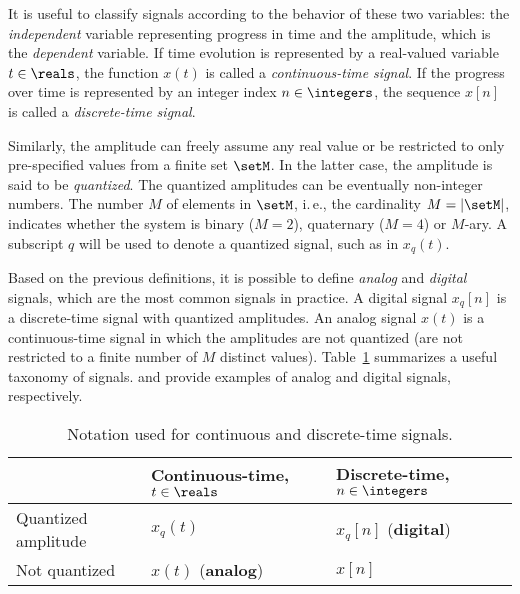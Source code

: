 It is useful to classify signals according to the behavior of these two variables: the \emph{independent} variable representing progress in time and the amplitude, which is the \emph{dependent} variable. If time evolution is represented by a real-valued variable $t \in \reals$, the function $x(t)$ is called a \emph{continuous-time signal}. If the progress over time is represented by an integer index $n \in \integers$, the sequence $x[n]$ is called a \emph{discrete-time signal}.

Similarly, the amplitude can freely assume any real value or be restricted to only pre-specified values from a finite set $\setM$. In the latter case, the amplitude is said to be \emph{quantized}. The quantized amplitudes can be eventually non-integer numbers. The number $M$ of elements in $\setM$, i.\,e., the cardinality $M=|\setM|$, indicates whether the system is binary ($M=2$), quaternary ($M=4$) or $M$-ary. A subscript $q$ will be used to denote a quantized signal, such as in $x_q(t)$.

Based on the previous definitions, it is possible to define \emph{analog} and \emph{digital} signals, which are the most common signals in practice.
A digital signal  $x_q[n]$ is a discrete-time signal with quantized amplitudes. An analog signal  $x(t)$ is a continuous-time signal in which the amplitudes are not quantized (are not restricted to a finite number of $M$ distinct values). Table~\ref{tab:signals_classification} summarizes a useful taxonomy of signals.
 and  provide examples of analog and digital signals, respectively. 

\begin{table}
 \centering
 \caption{Notation used for continuous and discrete-time signals. \label{tab:signals_classification}}
 \begin{tabularx}{\textwidth}{lXX}
 \toprule
 							& Continuous-time, $t \in \reals$ & Discrete-time, $n \in \integers$ \\\midrule
Quantized amplitude		& $x_q(t)$ & $x_q[n]$ (\textbf{digital}) \\ 
Not quantized & $x(t)$ (\textbf{analog}) & $x[n]$ \\ \bottomrule
\end{tabularx}
\end{table}

